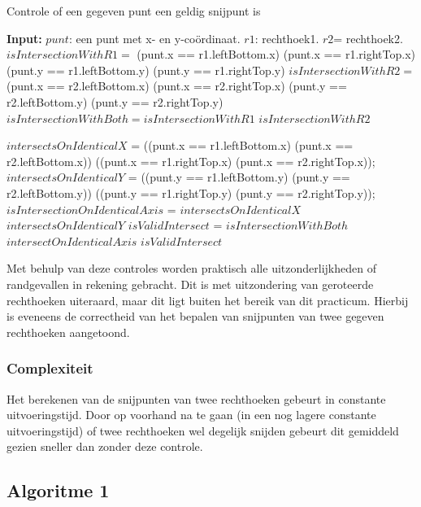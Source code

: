 \documentclass{article}
\begin{document}
\begin{algorithm}
\caption{Controle of een gegeven punt een geldig snijpunt is}
\begin{algorithmic}[1]
	\STATE \textbf{Input:}  $punt$: een punt met x- en y-co\"ordinaat. $r1$: rechthoek1. $r2$= rechthoek2. 
	\STATE $isIntersectionWithR1 =$ (punt.x == r1.leftBottom.x) \OR (punt.x == r1.rightTop.x) \OR (punt.y == r1.leftBottom.y) \OR (punt.y == r1.rightTop.y)
	\STATE $isIntersectionWithR2 =$ (punt.x == r2.leftBottom.x) \OR (punt.x == r2.rightTop.x) \OR (punt.y == r2.leftBottom.y) \OR (punt.y == r2.rightTop.y)
	\STATE $isIntersectionWithBoth = isIntersectionWithR1$ \AND $isIntersectionWithR2$
	
	\STATE $intersectsOnIdenticalX$ = ((punt.x == r1.leftBottom.x) \AND (punt.x == r2.leftBottom.x)) \OR ((punt.x == r1.rightTop.x) \AND (punt.x == r2.rightTop.x));
	\STATE $intersectsOnIdenticalY$ = ((punt.y == r1.leftBottom.y) \AND (punt.y == r2.leftBottom.y)) \OR ((punt.y == r1.rightTop.y) \AND (punt.y == r2.rightTop.y));
	\STATE $isIntersectionOnIdenticalAxis$ = $intersectsOnIdenticalX$ \OR $intersectsOnIdenticalY$
	\STATE $isValidIntersect$ = $isIntersectionWithBoth$ \AND \NOT$intersectOnIdenticalAxis$
	\RETURN $isValidIntersect$
\end{algorithmic}
\end{algorithm}

Met behulp van deze controles worden praktisch alle uitzonderlijkheden of randgevallen in rekening gebracht. Dit is met uitzondering van geroteerde rechthoeken uiteraard, maar dit ligt buiten het bereik van dit practicum.
Hierbij is eveneens de correctheid van het bepalen van snijpunten van twee gegeven rechthoeken aangetoond.

\subsubsection{Complexiteit}
Het berekenen van de snijpunten van twee rechthoeken gebeurt in constante uitvoeringstijd. Door op voorhand na te gaan (in een nog lagere constante uitvoeringstijd) of twee rechthoeken wel degelijk snijden gebeurt dit gemiddeld gezien sneller dan zonder deze controle.




\newpage
\subsection{Algoritme 1}
\label{algo1_1}
\end{document}
